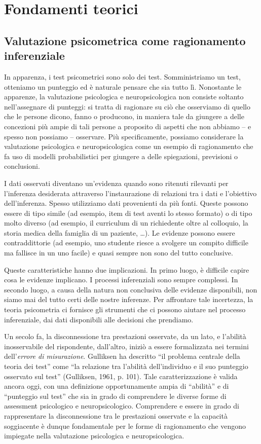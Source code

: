\chapter{Fondamenti teorici}
\label{ch:teoria_classica}


\section{Valutazione psicometrica come ragionamento inferenziale}

In apparenza, i test psicometrici sono solo dei test. 
Somministriamo un test, otteniamo un punteggio ed è naturale pensare che sia tutto lì. 
Nonostante le apparenze, la valutazione psicologica e neuropsicologica non consiste soltanto nell'assegnare di punteggi: si tratta di ragionare su ciò che osserviamo di quello che le persone dicono, fanno o producono, in maniera tale da giungere a delle concezioni più ampie di tali persone a proposito di aspetti che non abbiamo -- e spesso non possiamo -- osservare. 
Più specificamente, possiamo considerare la valutazione psicologica e neuropsicologica come un esempio di ragionamento che fa uso di modelli  probabilistici per giungere a delle spiegazioni, previsioni o conclusioni. 

I dati osservati diventano un'evidenza quando sono ritenuti rilevanti per l'inferenza desiderata attraverso l'instaurazione di relazioni tra i dati e l'obiettivo dell'inferenza. Spesso utilizziamo dati provenienti da più fonti. Queste possono essere di tipo simile (ad esempio, item di test aventi lo stesso formato) o di tipo molto diverso (ad esempio, il curriculum di un richiedente oltre al colloquio, la storia medica della famiglia di un paziente, \dots). Le evidenze possono essere contraddittorie (ad esempio, uno studente riesce a svolgere un compito difficile ma fallisce in un uno facile) e quasi sempre non sono del tutto conclusive.

Queste caratteristiche hanno due implicazioni. In primo luogo, è difficile capire cosa le evidenze implicano. I processi inferenziali sono sempre complessi. In secondo luogo, a causa della natura non conclusiva delle evidenze disponibili, non siamo mai del tutto certi delle nostre inferenze. Per affrontare tale incertezza, la teoria psicometria ci fornisce gli strumenti che ci possono aiutare nel processo inferenziale, dai dati disponibili alle decisioni che prendiamo. 

Un secolo fa, la disconnessione tra prestazioni osservate, da un lato, e l'abilità inosservabile del rispondente, dall'altro, iniziò a essere formalizzata nei termini dell'\emph{errore di misurazione}. Gulliksen ha descritto ``il problema centrale della teoria dei test'' come ``la relazione tra l'abilità dell'individuo e il suo punteggio osservato sul test'' (Gulliksen, 1961, p. 101). Tale caratterizzazione è valida ancora oggi, con una definizione opportunamente ampia di ``abilità'' e di ``punteggio sul test'' che sia in grado di comprendere le diverse forme di assessment psicologico e neuropsicologico. Comprendere e essere in grado di rappresentare la disconnessione tra le prestazioni osservate e la capacità soggiacente è dunque fondamentale per le forme di ragionamento che vengono impiegate nella valutazione psicologica e neuropsicologica.

